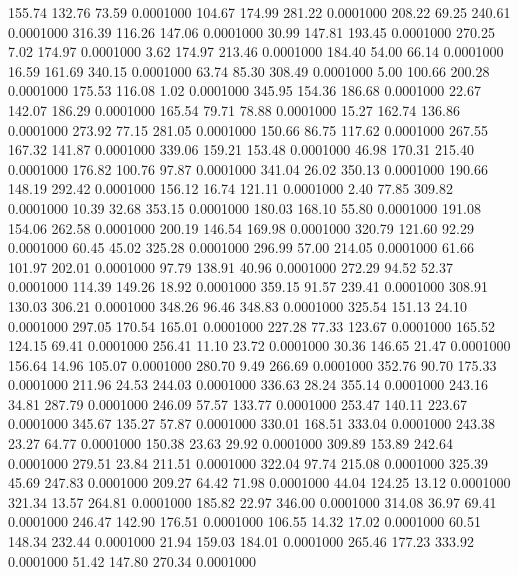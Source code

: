 155.74  132.76   73.59   0.0001000
 104.67  174.99  281.22   0.0001000
 208.22   69.25  240.61   0.0001000
 316.39  116.26  147.06   0.0001000
  30.99  147.81  193.45   0.0001000
 270.25    7.02  174.97   0.0001000
   3.62  174.97  213.46   0.0001000
 184.40   54.00   66.14   0.0001000
  16.59  161.69  340.15   0.0001000
  63.74   85.30  308.49   0.0001000
   5.00  100.66  200.28   0.0001000
 175.53  116.08    1.02   0.0001000
 345.95  154.36  186.68   0.0001000
  22.67  142.07  186.29   0.0001000
 165.54   79.71   78.88   0.0001000
  15.27  162.74  136.86   0.0001000
 273.92   77.15  281.05   0.0001000
 150.66   86.75  117.62   0.0001000
 267.55  167.32  141.87   0.0001000
 339.06  159.21  153.48   0.0001000
  46.98  170.31  215.40   0.0001000
 176.82  100.76   97.87   0.0001000
 341.04   26.02  350.13   0.0001000
 190.66  148.19  292.42   0.0001000
 156.12   16.74  121.11   0.0001000
   2.40   77.85  309.82   0.0001000
  10.39   32.68  353.15   0.0001000
 180.03  168.10   55.80   0.0001000
 191.08  154.06  262.58   0.0001000
 200.19  146.54  169.98   0.0001000
 320.79  121.60   92.29   0.0001000
  60.45   45.02  325.28   0.0001000
 296.99   57.00  214.05   0.0001000
  61.66  101.97  202.01   0.0001000
  97.79  138.91   40.96   0.0001000
 272.29   94.52   52.37   0.0001000
 114.39  149.26   18.92   0.0001000
 359.15   91.57  239.41   0.0001000
 308.91  130.03  306.21   0.0001000
 348.26   96.46  348.83   0.0001000
 325.54  151.13   24.10   0.0001000
 297.05  170.54  165.01   0.0001000
 227.28   77.33  123.67   0.0001000
 165.52  124.15   69.41   0.0001000
 256.41   11.10   23.72   0.0001000
  30.36  146.65   21.47   0.0001000
 156.64   14.96  105.07   0.0001000
 280.70    9.49  266.69   0.0001000
 352.76   90.70  175.33   0.0001000
 211.96   24.53  244.03   0.0001000
 336.63   28.24  355.14   0.0001000
 243.16   34.81  287.79   0.0001000
 246.09   57.57  133.77   0.0001000
 253.47  140.11  223.67   0.0001000
 345.67  135.27   57.87   0.0001000
 330.01  168.51  333.04   0.0001000
 243.38   23.27   64.77   0.0001000
 150.38   23.63   29.92   0.0001000
 309.89  153.89  242.64   0.0001000
 279.51   23.84  211.51   0.0001000
 322.04   97.74  215.08   0.0001000
 325.39   45.69  247.83   0.0001000
 209.27   64.42   71.98   0.0001000
  44.04  124.25   13.12   0.0001000
 321.34   13.57  264.81   0.0001000
 185.82   22.97  346.00   0.0001000
 314.08   36.97   69.41   0.0001000
 246.47  142.90  176.51   0.0001000
 106.55   14.32   17.02   0.0001000
  60.51  148.34  232.44   0.0001000
  21.94  159.03  184.01   0.0001000
 265.46  177.23  333.92   0.0001000
  51.42  147.80  270.34   0.0001000
